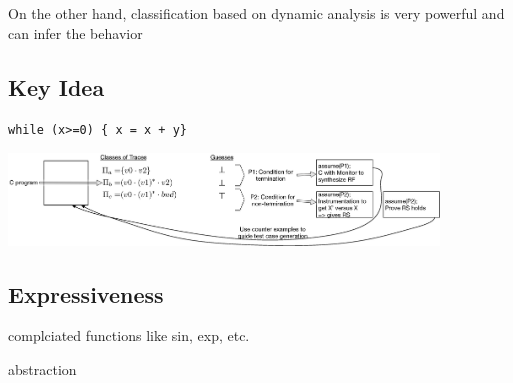 On the other hand, classification based on dynamic analysis is very powerful and can infer the behavior




\subsection{Key Idea}

\begin{center}
\texttt{while (x>=0) \{ x = x + y\}}

\bigskip
\includegraphics[width=4.5in]{boxes.eps}

\end{center}

\subsection{Expressiveness}

complciated functions like sin, exp, etc.

abstraction
